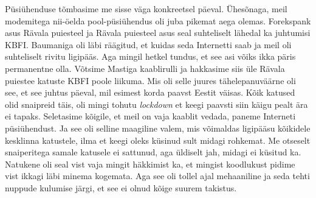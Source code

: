 Püsiühenduse tõmbasime me sisse väga konkreetsel päeval. Ühesõnaga, meil 
modemitega nii-öelda pool-püsiühendus oli juba pikemat aega olemas.  
Forekspank asus Rävala puiesteel ja Rävala puiesteel asus seal suhteliselt 
lähedal ka juhtumisi KBFI. Baumaniga 
oli läbi räägitud, et kuidas seda Internetti saab ja meil oli suhteliselt 
rivitu ligipääs. Aga mingil hetkel tundus, et see asi võiks ikka päris 
permanentne olla. Võtsime Mastiga kaablirulli ja 
hakkasime siis üle Rävala puiestee katuste KBFI poole liikuma. Mis oli selle 
juures tähelepanuväärne oli see, et see juhtus päeval, mil esimest korda paavst 
Eestit väisas. 
Kõik katused olid snaipreid täis, oli mingi tohutu 
\emph{lockdown} et keegi paavsti siin käigu pealt ära ei tapaks.  
Seletasime kõigile, et meil on vaja kaablit vedada,  paneme Interneti 
püsiühendust. Ja see oli selline maagiline valem, mis  võimaldas ligipääsu 
kõikidele kesklinna katustele, ilma et keegi oleks küsinud sult midagi 
rohkemat. Me otseselt snaiperitega samale katusele ei sattunud, aga üldiselt 
jah, midagi ei küsitud ka. Natukene oli seal vist vaja mingit häkkimist ka, et 
mingist koodlukust pidime vist ikkagi läbi minema kogemata. Aga see oli tollel 
ajal mehaaniline ja seda tehti nuppude kulumise järgi, et see ei olnud kõige 
suurem takistus. 


